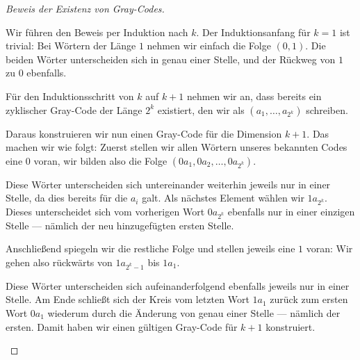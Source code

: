 \begin{proof}[Beweis der Existenz von Gray-Codes]
\begin{spoken-clean}[00:46:50 - 00:48:18]
Wir führen den Beweis per Induktion nach $k$. Der Induktionsanfang für $k=1$ ist trivial: Bei Wörtern der Länge $1$ nehmen wir einfach die Folge $(0, 1)$. Die beiden Wörter unterscheiden sich in genau einer Stelle, und der Rückweg von $1$ zu $0$ ebenfalls.

Für den Induktionsschritt von $k$ auf $k+1$ nehmen wir an, dass bereits ein zyklischer Gray-Code der Länge $2^k$ existiert, den wir als $(a_1, \dots, a_{2^k})$ schreiben.
\end{spoken-clean}

\begin{spoken-clean}[00:48:18 - 00:49:28]
Daraus konstruieren wir nun einen Gray-Code für die Dimension $k+1$. Das machen wir wie folgt: Zuerst stellen wir allen Wörtern unseres bekannten Codes eine $0$ voran, wir bilden also die Folge $(0a_1, 0a_2, \dots, 0a_{2^k})$.
\end{spoken-clean}

\begin{spoken-clean}[00:49:28 - 00:50:58]
Diese Wörter unterscheiden sich untereinander weiterhin jeweils nur in einer Stelle, da dies bereits für die $a_i$ galt. Als nächstes Element wählen wir $1a_{2^k}$. Dieses unterscheidet sich vom vorherigen Wort $0a_{2^k}$ ebenfalls nur in einer einzigen Stelle --- nämlich der neu hinzugefügten ersten Stelle.

Anschließend spiegeln wir die restliche Folge und stellen jeweils eine $1$ voran: Wir gehen also rückwärts von $1a_{2^k-1}$ bis $1a_1$.
\end{spoken-clean}

\begin{spoken-clean}[00:50:58 - 00:52:40]
Diese Wörter unterscheiden sich aufeinanderfolgend ebenfalls jeweils nur in einer Stelle. Am Ende schließt sich der Kreis vom letzten Wort $1a_1$ zurück zum ersten Wort $0a_1$ wiederum durch die Änderung von genau einer Stelle --- nämlich der ersten. Damit haben wir einen gültigen Gray-Code für $k+1$ konstruiert.
\end{spoken-clean}


\end{proof}
